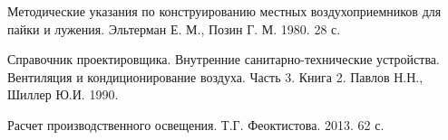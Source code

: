    Методические указания по конструированию
                                        местных воздухоприемников для пайки и лужения.
                                        Эльтерман Е. М., Позин Г. М.
                                        1980. 28 с.

  Справочник проектировщика.
                                            Внутренние санитарно-технические устройства.
                                            Вентиляция и кондиционирование воздуха.
                                            Часть 3. Книга 2.
                                            Павлов Н.Н., Шиллер Ю.И.
                                            1990.

  Расчет производственного освещения.
                                Т.Г. Феоктистова.
                                2013. 62 с.

